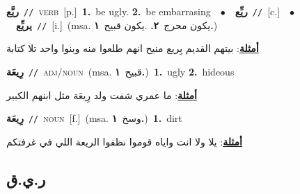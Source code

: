 \documentclass[10pt,a4paper,twoside]{article} %
\begin{document}
\begin{multicols}{2}
{\setlength\topsep{0pt}\textbf{\foreignlanguage{arabic}{ريَّع}}\ {\color{gray}\texttt{//}\color{black}}\ \textsc{verb}\ [p.]\ \textbf{1.}~be ugly.  \textbf{2.}~be embarrasing\ \ $\bullet$\ \ \setlength\topsep{0pt}\textbf{\foreignlanguage{arabic}{ريِّع}}\ {\color{gray}\texttt{//}\color{black}}\ [c.]\ \ $\bullet$\ \ \setlength\topsep{0pt}\textbf{\foreignlanguage{arabic}{يريِّع}}\ {\color{gray}\texttt{//}\color{black}}\ [i.]\ \color{gray}(msa. \foreignlanguage{arabic}{يكون محرج}~\foreignlanguage{arabic}{\textbf{٢.}}  .\foreignlanguage{arabic}{يكون قبيح}~\foreignlanguage{arabic}{\textbf{١.}})\color{black}\  \begin{flushright}\color{gray}\foreignlanguage{arabic}{\textbf{\underline{\foreignlanguage{arabic}{أمثلة}}}: بيتهم القديم بِريع منيح انهم طلعوا منه وبنوا واحد تلا كتابة}\end{flushright}\color{black}} \vspace{2mm}

{\setlength\topsep{0pt}\textbf{\foreignlanguage{arabic}{رِيعَة}}\ {\color{gray}\texttt{//}\color{black}}\ \textsc{adj/noun}\ \color{gray}(msa. \foreignlanguage{arabic}{قبيح}~\foreignlanguage{arabic}{\textbf{١.}})\color{black}\ \textbf{1.}~ugly  \textbf{2.}~hideous\  \begin{flushright}\color{gray}\foreignlanguage{arabic}{\textbf{\underline{\foreignlanguage{arabic}{أمثلة}}}: ما عمري شفت ولد رِيعَة مثل ابنهم الكبير}\end{flushright}\color{black}} \vspace{2mm}

{\setlength\topsep{0pt}\textbf{\foreignlanguage{arabic}{رِيعَة}}\ {\color{gray}\texttt{//}\color{black}}\ \textsc{noun}\ [f.]\ \color{gray}(msa. \foreignlanguage{arabic}{وسخ}~\foreignlanguage{arabic}{\textbf{١.}})\color{black}\ \textbf{1.}~dirt\  \begin{flushright}\color{gray}\foreignlanguage{arabic}{\textbf{\underline{\foreignlanguage{arabic}{أمثلة}}}: يلا ولا انت واياه قوموا نظفوا الريعة اللي في غرفتكم}\end{flushright}\color{black}} \vspace{2mm}

\vspace{-3mm}
\subsection*{\color{blue}\foreignlanguage{arabic}{ر.ي.ق}\color{blue}{}} 


\end{multicols}
\end{document}
